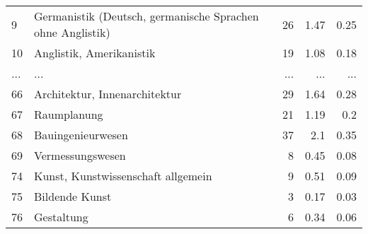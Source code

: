 \begin{longtable}{lXrrr}
        9 & \multicolumn{1}{X}{Germanistik (Deutsch, germanische Sprachen ohne Anglistik)} & %
          \num{26} &
          \num[round-mode=places,round-precision=2]{1.47} &
          \num[round-mode=places,round-precision=2]{0.25} \\
        10 & \multicolumn{1}{X}{Anglistik, Amerikanistik} & %
          \num{19} &
          \num[round-mode=places,round-precision=2]{1.08} &
          \num[round-mode=places,round-precision=2]{0.18} \\
       ... & ... & ... & ... & ... \\
        66 & \multicolumn{1}{X}{Architektur, Innenarchitektur} & %
          \num{29} &
          \num[round-mode=places,round-precision=2]{1.64} &
          \num[round-mode=places,round-precision=2]{0.28} \\

        67 & \multicolumn{1}{X}{Raumplanung} & %
          \num{21} &
          \num[round-mode=places,round-precision=2]{1.19} &
          \num[round-mode=places,round-precision=2]{0.2} \\

        68 & \multicolumn{1}{X}{Bauingenieurwesen} & %
          \num{37} &
          \num[round-mode=places,round-precision=2]{2.1} &
          \num[round-mode=places,round-precision=2]{0.35} \\

        69 & \multicolumn{1}{X}{Vermessungswesen} & %
          \num{8} &
          \num[round-mode=places,round-precision=2]{0.45} &
          \num[round-mode=places,round-precision=2]{0.08} \\

        74 & \multicolumn{1}{X}{Kunst, Kunstwissenschaft allgemein} & %
          \num{9} &
          \num[round-mode=places,round-precision=2]{0.51} &
          \num[round-mode=places,round-precision=2]{0.09} \\

        75 & \multicolumn{1}{X}{Bildende Kunst} & %
          \num{3} &
          \num[round-mode=places,round-precision=2]{0.17} &
          \num[round-mode=places,round-precision=2]{0.03} \\

        76 & \multicolumn{1}{X}{Gestaltung} & %
          \num{6} &
          \num[round-mode=places,round-precision=2]{0.34} &
          \num[round-mode=places,round-precision=2]{0.06} \\


\end{longtable}
